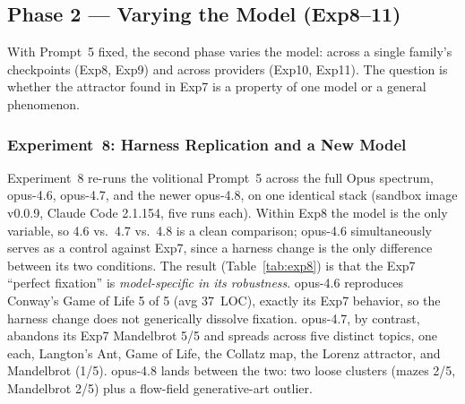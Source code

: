 \documentclass{article}
\begin{document}
\begin{table}[t]
\caption{Experiment~7 supplementary: Prompt~3 on harness 2.1.112
  for the other four Claude models.}
\label{tab:exp7_supp}
\small{}
\end{table}

\subsection{Phase 2 --- Varying the Model (Exp8--11)}
\label{sec:phase-model}

With Prompt~5 fixed, the second phase varies the model: across a
single family's checkpoints (Exp8, Exp9) and across providers
(Exp10, Exp11). The question is whether the attractor found in
Exp7 is a property of one model or a general phenomenon.

\subsubsection{Experiment~8: Harness Replication and a New Model}

Experiment~8 re-runs the volitional Prompt~5 across the full
Opus spectrum, opus-4.6, opus-4.7, and the newer opus-4.8, on
one identical stack (sandbox image v0.0.9, Claude Code 2.1.154,
five runs each). Within Exp8 the model is the only variable, so
4.6 vs.\ 4.7 vs.\ 4.8 is a clean comparison; opus-4.6
simultaneously serves as a control against Exp7, since a harness
change is the only difference between its two conditions. The
result (Table~\ref{tab:exp8}) is that the Exp7 ``perfect
fixation'' is \emph{model-specific in its robustness}. opus-4.6
reproduces Conway's Game of Life 5 of 5 (avg 37~LOC), exactly its
Exp7 behavior, so the harness change does not generically
dissolve fixation. opus-4.7, by contrast, abandons its Exp7
Mandelbrot 5/5 and spreads across five distinct topics, one
each, Langton's Ant, Game of Life, the Collatz map, the Lorenz
attractor, and Mandelbrot (1/5). opus-4.8 lands between the two:
two loose clusters (mazes 2/5, Mandelbrot 2/5) plus a
flow-field generative-art outlier.
\end{document}
